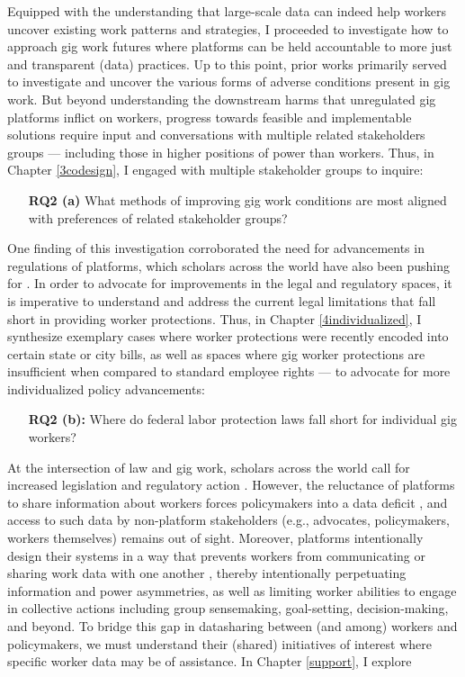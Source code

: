 Equipped with the understanding that large-scale data can indeed help workers uncover existing work patterns and strategies, I proceeded to investigate how to approach gig work futures where platforms can be held accountable to more just and transparent (data) practices. Up to this point, prior works primarily served to investigate and uncover the various forms of adverse conditions present in gig work. But beyond understanding the downstream harms that unregulated gig platforms inflict on workers, progress towards feasible and implementable solutions require input and conversations with multiple related stakeholders groups --- including those in higher positions of power than workers. Thus, in Chapter \ref{3codesign}, I engaged with multiple stakeholder groups to inquire:

\begin{enumerate}
    \item[\textbf{RQ2 (a)}] What methods of improving gig work conditions are most aligned with preferences of related stakeholder groups? \cite{codesign}
\end{enumerate}

One finding of this investigation corroborated the need for advancements in regulations of platforms, which scholars across the world have also been pushing for \cite{regulate, deficit, regulating, Dubal2017-bj, Dubal2019-qi}. In order to advocate for improvements in the legal and regulatory spaces, it is imperative to understand and address the current legal limitations that fall short in providing worker protections. Thus, in Chapter \ref{4individualized}, I synthesize exemplary cases where worker protections were recently encoded into certain state or city bills, as well as spaces where gig worker protections are insufficient when compared to standard employee rights --- to advocate for more individualized policy advancements:

\begin{enumerate}
    \item[\textbf{RQ2 (b):}] Where do federal labor protection laws fall short for individual gig workers? \cite{individualized}
\end{enumerate}

At the intersection of law and gig work, scholars across the world call for increased legislation and regulatory action \cite{regulate, organizing}.
However, the reluctance of platforms to share information about workers forces policymakers into a data deficit \cite{deficit}, and access to such data by non-platform stakeholders (e.g., advocates, policymakers, workers themselves) remains out of sight. 
Moreover, platforms intentionally design their systems in a way that prevents workers from communicating or sharing work data with one another \cite{uuapp}, thereby intentionally perpetuating information and power asymmetries, as well as limiting worker abilities to engage in collective actions including group sensemaking, goal-setting, decision-making, and beyond. To bridge this gap in datasharing between (and among) workers and policymakers, we must understand their (shared) initiatives of interest where specific worker data may be of assistance. In Chapter \ref{support}, I explore

